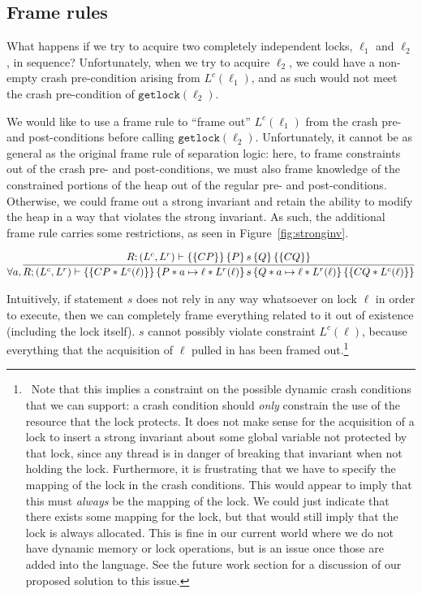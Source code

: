 \subsection{Frame rules}

What happens if we try to acquire two completely independent locks, $\ell_1$ and
$\ell_2$, in sequence? Unfortunately, when we try to acquire $\ell_2$, we could
have a non-empty crash pre-condition arising from $L^c(\ell_1)$, and as such
would not meet the crash pre-condition of $\texttt{getlock}(\ell_2)$.

We would like to use a frame rule to ``frame out'' $L^c(\ell_1)$ from the crash
pre- and post-conditions before calling $\texttt{getlock}(\ell_2)$.
Unfortunately, it cannot be as general as the original frame rule of separation
logic: here, to frame constraints out of the crash pre- and post-conditions, we
must also frame knowledge of the constrained portions of the heap out of the
regular pre- and post-conditions.
Otherwise, we could frame out a strong
invariant and retain the ability to modify the heap in a way that violates the
strong invariant.
As such, the additional frame rule carries some restrictions,
as seen in Figure~\ref{fig:stronginv}.

\begin{figure*}
\begin{gather*}
    \forall a, \infer
	{\hoarestmt{R}{(L^c,L^r)}{CP * L^c(\ell)}{P * a \mapsto \ell * L^r(\ell)}{s}{Q * a \mapsto \ell * L^r(\ell)}{CQ * L^c(\ell)}}
	{\hoarestmt{R}{(L^c,L^r)}{CP}{P}{s}{Q}{CQ}}
\end{gather*}
\caption{Frame rule for strong invariants}
\label{fig:stronginv}
\end{figure*}

Intuitively, if statement $s$ does not rely in any way whatsoever on lock $\ell$
in order to execute, then we can completely frame everything related to it out
of existence (including the lock itself).
$s$ cannot possibly violate constraint
$L^c(\ell)$, because everything that the acquisition of $\ell$ pulled in has
been framed out.\footnote{\
Note that this implies a constraint on the possible
dynamic crash conditions that we can support: a crash condition should
\textit{only} constrain the use of the resource that the lock
protects.
It does
not make sense for the acquisition of a lock to insert a strong invariant about
some global variable not protected by that lock, since any thread is in danger
of breaking that invariant when not holding the lock.
Furthermore, it is
frustrating that we have to specify the mapping of the lock in the crash
conditions.
This would appear to imply that this must \textit{always} be the
mapping of the lock.
We could just indicate that there exists some mapping
for the lock, but that would still imply that the lock is always allocated.
This is fine in our current world where we do not have dynamic memory or lock
operations, but is an issue once those are added into the language.
See the
future work section for a discussion of our proposed solution to this issue.}

